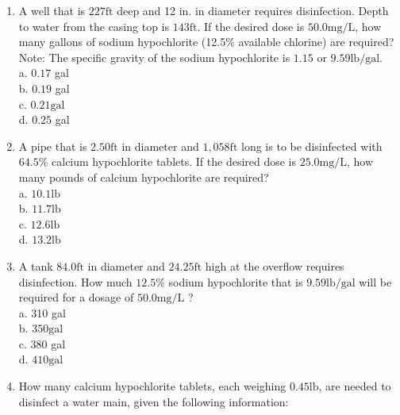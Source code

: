 \documentclass[10pt]{article}
\begin{document}
\begin{enumerate}
  \item A well that is $227 \mathrm{ft}$ deep and 12 in. in diameter requires disinfection. Depth to water from the casing top is $143 \mathrm{ft}$. If the desired dose is $50.0 \mathrm{mg} / \mathrm{L}$, how many gallons of sodium hypochlorite (12.5\% available chlorine) are required? Note: The specific gravity of the sodium hypochlorite is $1.15$ or $9.59 \mathrm{lb} / \mathrm{gal}$.\\
a. $0.17$ gal\\
b. $0.19$ gal\\
c. $0.21 \mathrm{gal}$\\
d. $0.25$ gal

  \item A pipe that is $2.50 \mathrm{ft}$ in diameter and $1,058 \mathrm{ft}$ long is to be disinfected with $64.5 \%$ calcium hypochlorite tablets. If the desired dose is $25.0 \mathrm{mg} / \mathrm{L}$, how many pounds of calcium hypochlorite are required?\\
a. $10.1 \mathrm{lb}$\\
b. $11.7 \mathrm{lb}$\\
c. $12.6 \mathrm{lb}$\\
d. $13.2 \mathrm{lb}$

  \item A tank $84.0 \mathrm{ft}$ in diameter and $24.25 \mathrm{ft}$ high at the overflow requires disinfection. How much $12.5 \%$ sodium hypochlorite that is $9.59 \mathrm{lb} / \mathrm{gal}$ will be required for a dosage of $50.0 \mathrm{mg} / \mathrm{L}$ ?\\
a. 310 gal\\
b. $350 \mathrm{gal}$\\
c. 380 gal\\
d. $410 \mathrm{gal}$

  \item How many calcium hypochlorite tablets, each weighing $0.45 \mathrm{lb}$, are needed to disinfect a water main, given the following information:

\end{enumerate}
\end{document}
